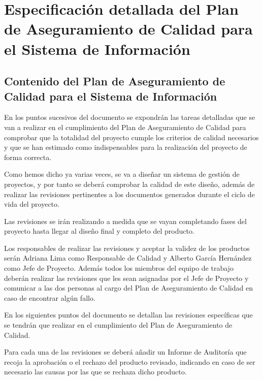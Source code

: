 \section{Especificación detallada del Plan de Aseguramiento de Calidad para el Sistema de Información}
\subsection{Contenido del Plan de Aseguramiento de Calidad para el Sistema de Información}
\par En los puntos sucesivos del documento se expondrán las tareas detalladas que se van a realizar en el cumplimiento del Plan de Aseguramiento de Calidad para comprobar que la totalidad del proyecto cumple los criterios de calidad necesarios y que se han estimado como indispensables para la realización del proyecto de forma correcta.

Como hemos dicho ya varias veces, se va a diseñar un sistema de gestión de proyectos, y por tanto se deberá comprobar la calidad de este diseño, además de realizar las revisiones pertinentes a los documentos generados durante el ciclo de vida del proyecto.

Las revisiones se irán realizando a medida que se vayan completando fases del proyecto hasta llegar al diseño final y completo del producto.

Los responsables de realizar las revisiones y aceptar la validez de los productos serán Adriana Lima como Responsable de Calidad y Alberto García Hernández como Jefe de Proyecto. Además todos los miembros del equipo de trabajo deberán realizar las revisiones que les sean asignadas por el Jefe de Proyecto y comunicar a las dos personas al cargo del Plan de Aseguramiento de Calidad en caso de encontrar algún fallo.

En los siguientes puntos del documento se detallan las revisiones específicas que se tendrán que realizar en el cumplimiento del Plan de Aseguramiento de Calidad.

Para cada una de las revisiones se deberá añadir un Informe de Auditoría que recoja la aprobación o el rechazo del producto revisado, indicando en caso de ser necesario las causas por las que se rechaza dicho producto.
